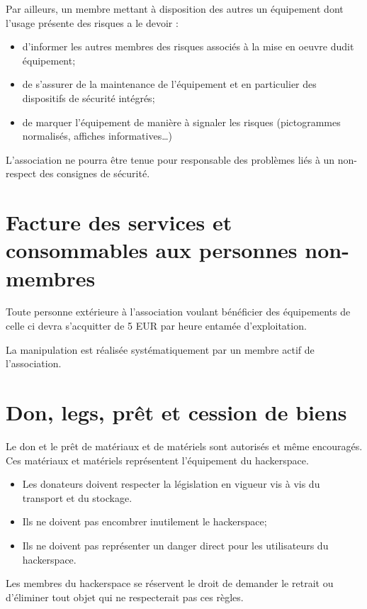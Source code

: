 \documentclass[a4paper, 11pt]{article}
\begin{document}
Par ailleurs, un membre mettant à disposition des autres un équipement dont l'usage présente des risques a le devoir :

\begin{itemize}
    \item d'informer les autres membres des risques associés à la mise en oeuvre dudit équipement;
    \item de s'assurer de la maintenance de l'équipement et en particulier des dispositifs de sécurité intégrés;
    \item de marquer l'équipement de manière à signaler les risques (pictogrammes normalisés, affiches
        informatives\ldots)
\end{itemize}

L'association ne pourra être tenue pour responsable des problèmes liés à un non-respect des consignes de sécurité.


\section{Facture des services et consommables aux personnes non-membres}

Toute personne extérieure à l'association voulant bénéficier des
équipements de celle ci devra s'acquitter de 5 EUR par heure entamée
d'exploitation.


La manipulation est réalisée systématiquement par un membre actif de
l'association.

\section{Don, legs, prêt et cession de biens} %

Le don et le prêt de matériaux et de matériels sont autorisés et même encouragés. Ces matériaux et matériels représentent l'équipement du hackerspace.

\begin{itemize}
    \item Les donateurs doivent respecter la législation en vigueur vis à vis du transport et du stockage.
    \item Ils ne doivent pas encombrer inutilement le hackerspace;
    \item Ils ne doivent pas représenter un danger direct pour les utilisateurs du hackerspace.
\end{itemize}

Les membres du hackerspace se réservent le droit de demander le retrait ou d'éliminer tout objet qui ne respecterait pas ces règles.
\end{document}
